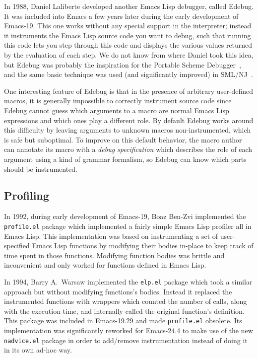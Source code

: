 \documentclass[format=acmsmall, review]{acmart}
\newcommand \Elisp {Emacs Lisp}
\begin{document}
In 1988, Daniel Laliberte developed another \Elisp{} debugger, called
Edebug.  It was included into Emacs a few years later during the early
development of Emacs-19.  This one works without any special support in the
interpreter; instead it instruments the \Elisp{} source code you want to
debug, such that running this code lets you step through this code and
displays the various values returned by the evaluation of each step.  We do
not know from where Daniel took this idea, but Edebug was probably the
inspiration for the Portable Scheme Debugger~\cite{Kellomaki93}, and the
same basic technique was used (and significantly improved) in
SML/NJ~\cite{Tolmach90}.

One interesting feature of Edebug is that in the presence of arbitrary
user-defined macros, it is generally impossible to correctly instrument
source code since Edebug cannot guess which arguments to a macro are normal
\Elisp{} expressions and which ones play a different role.  By default
Edebug works around this difficulty by leaving arguments to unknown macros
non-instrumented, which is safe but suboptimal.  To improve on this default
behavior, the macro author can annotate its macro with a \emph{debug
  specification} which describes the role of each argument using a kind of
grammar formalism, so Edebug can know which parts should be
instrumented.


\subsection{Profiling}
\label{sec:profiler}

In 1992, during early development of Emacs-19, Boaz Ben-Zvi implemented the
\texttt{profile.el} package which implemented a fairly simple \Elisp{}
profiler all in \Elisp{}.  This implementation was based on instrumenting
a set of user-specified \Elisp{} functions by modifying their bodies in-place
to keep track of time spent in those functions. Modifying function
bodies was brittle and inconvenient and only worked for functions
defined in \Elisp.

In 1994, Barry A.~Warsaw implemented the \texttt{elp.el} package which took
a similar approach but without modifying functions's bodies.
Instead it replaced the instrumented functions with wrappers which counted
the number of calls, along with the execution time, and internally called
the original function's definition.  This package was included in
Emacs-19.29 and made \texttt{profile.el} obsolete.  Its implementation was
significantly reworked for Emacs-24.4 to make use of the new
\texttt{nadvice.el} package in order to add/remove instrumentation instead
of doing it in its own ad-hoc way.
\end{document}

